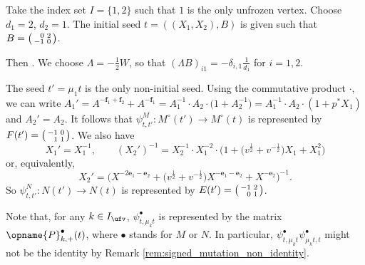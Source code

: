 \documentclass[pdftex]{sigma}
\newcommand{\Mc}{M^\circ}
\newcommand{\Iufv}{I_{\ufv}}
\newcommand{\trans}{\opname{P}}
\newcommand{\ee}{\mathbf{e}}
\newcommand{\ff}{\mathbf{f}}
\numberwithin{equation}{section}
\begin{document}
\begin{Example}\label{eg:A_1_eg}
Take the index set $I=\{1,2\}$ such that $1$ is the only unfrozen
vertex. Choose $d_{1}=2$, $d_{2}=1$. The initial seed $t=((X_{1},X_{2}),B)$
is given such that $B=\left(\begin{smallmatrix}
\hphantom{-}0 & 2\\
-1 & 0
\end{smallmatrix}\right)$.

Then . We choose $\Lambda=-\frac{1}{2}W$, so that $(\Lambda B)_{i1}=-\delta_{i,1}\frac{1}{d_1}$ for $i=1,2$.

The seed $t'=\mu_{1}t$ is the only non-initial seed. Using the commutative product $\cdot$, we can write $A_{1}'=A^{-\ff_1+\ff_2}+A^{-\ff_1}=A_{1}^{-1}\cdot A_{2}\cdot \big(1+A_{2}^{-1}\big)=A_{1}^{-1}\cdot A_{2}\cdot (1+p^{*}X_{1})$
and $A_{2}'=A_{2}.$ It follows that $\psi_{t,t'}^{M}\colon \Mc(t')\rightarrow\Mc(t)$
is represented by $F(t')=\left(\begin{smallmatrix}
-1 & 0\\
\hphantom{-}1 & 1
\end{smallmatrix}\right)$. We also have \[X_{1}'=X_{1}^{-1}, \qquad (X_{2}')^{-1}=X_{2}^{-1}\cdot X_{1}^{-2}\cdot \big(1+\big(v^{\frac{1}{2}}+v^{-\frac{1}{2}}\big)X_1+X_{1}^2\big)\] or, equivalently, \[X_2'=\big(X^{-2\ee_1-\ee_2}+\big(v^{\frac{1}{2}}+v^{-\frac{1}{2}}\big)X^{-\ee_1-\ee_2}+X^{-\ee_2}\big)^{-1}.\]
So $\psi_{t,t'}^{N}\colon N(t')\rightarrow N(t)$ is represented by $E(t')=\left(\begin{smallmatrix}
-1 & 2\\
\hphantom{-}0 & 1
\end{smallmatrix}\right)$.

\end{Example}

Note that, for any $k\in\Iufv$, $\psi_{t,\mu_{k}t}^{\bullet}$ is
represented by the matrix $\trans_{k,+}^{\bullet}(t)$, where $\bullet$
stands for $M$ or $N$. In particular, $\psi_{t,\mu_{k}t}^{\bullet}\psi_{\mu_{k}t,t}^{\bullet}$
might not be the identity by Remark \ref{rem:signed_mutation_non_identity}.
\end{document}
